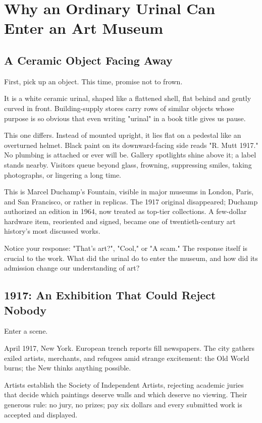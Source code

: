 \chapter[Why a Urinal Can Be Museum Art]{Why an Ordinary Urinal Can Enter an Art Museum}
\section{A Ceramic Object Facing Away}
First, pick up an object. This time, promise not to frown.

It is a white ceramic urinal, shaped like a flattened shell, flat behind and gently curved in front. Building-supply stores carry rows of similar objects whose purpose is so obvious that even writing "urinal" in a book title gives us pause.

This one differs. Instead of mounted upright, it lies flat on a pedestal like an overturned helmet. Black paint on its downward-facing side reads "R. Mutt 1917." No plumbing is attached or ever will be. Gallery spotlights shine above it; a label stands nearby. Visitors queue beyond glass, frowning, suppressing smiles, taking photographs, or lingering a long time.

This is Marcel Duchamp's Fountain, visible in major museums in London, Paris, and San Francisco, or rather in replicas. The 1917 original disappeared; Duchamp authorized an edition in 1964, now treated as top-tier collections. A few-dollar hardware item, reoriented and signed, became one of twentieth-century art history's most discussed works.

Notice your response: "That's art?", "Cool," or "A scam." The response itself is crucial to the work. What did the urinal do to enter the museum, and how did its admission change our understanding of art?

\section{1917: An Exhibition That Could Reject Nobody}
Enter a scene.

April 1917, New York. European trench reports fill newspapers. The city gathers exiled artists, merchants, and refugees amid strange excitement: the Old World burns; the New thinks anything possible.

Artists establish the Society of Independent Artists, rejecting academic juries that decide which paintings deserve walls and which deserve no viewing. Their generous rule: no jury, no prizes; pay six dollars and every submitted work is accepted and displayed.

